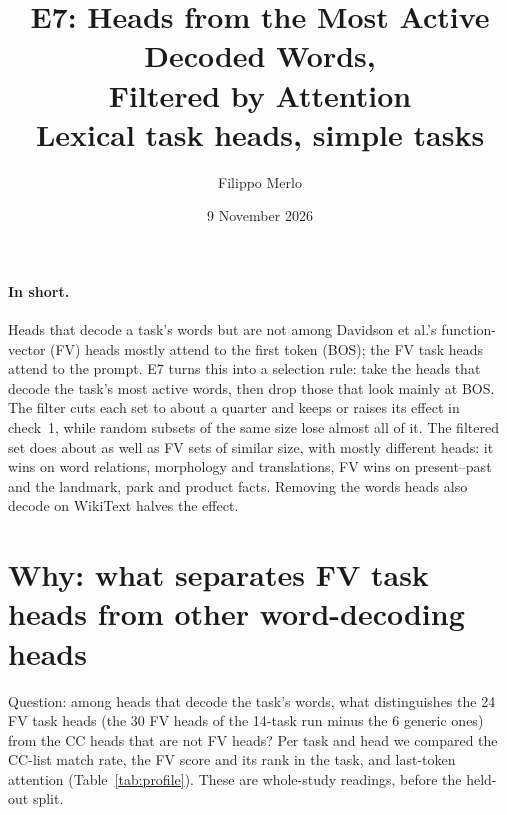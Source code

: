 \documentclass[10pt,a4paper]{article}
\title{E7: Heads from the Most Active Decoded Words,\\ Filtered by Attention\\\large Lexical task heads, simple tasks}
\author{Filippo Merlo}
\date{9 November 2026}
\begin{document}
\maketitle
\vspace{-1.5em}

\paragraph{In short.} Heads that decode a task's words but are not among Davidson et al.'s function-vector (FV) heads mostly attend to the first token (BOS); the FV task heads attend to the prompt. E7 turns this into a selection rule: take the heads that decode the task's most active words, then drop those that look mainly at BOS. The filter cuts each set to about a quarter and keeps or raises its effect in check~1, while random subsets of the same size lose almost all of it. The filtered set does about as well as FV sets of similar size, with mostly different heads: it wins on word relations, morphology and translations, FV wins on present--past and the landmark, park and product facts. Removing the words heads also decode on WikiText halves the effect.

\section{Why: what separates FV task heads from other word-decoding heads}

Question: among heads that decode the task's words, what distinguishes the 24 FV task heads (the 30 FV heads of the 14-task run minus the 6 generic ones) from the CC heads that are not FV heads? Per task and head we compared the CC-list match rate, the FV score and its rank in the task, and last-token attention (Table~\ref{tab:profile}). These are whole-study readings, before the held-out split.

\begin{table}[H]\centering\small

\caption{Medians per (task, head). FV task heads split by whether they decode the task's CC list (rate $\geq$0.3); CC-only = in the task's CC top 20 by match rate, not an FV head. Attention at the last prompt token, averaged over tasks. Source: \texttt{results/davidson\_fv\_diff/fv\_vs\_cc.json}.}
\label{tab:profile}
\end{table}
\end{document}
